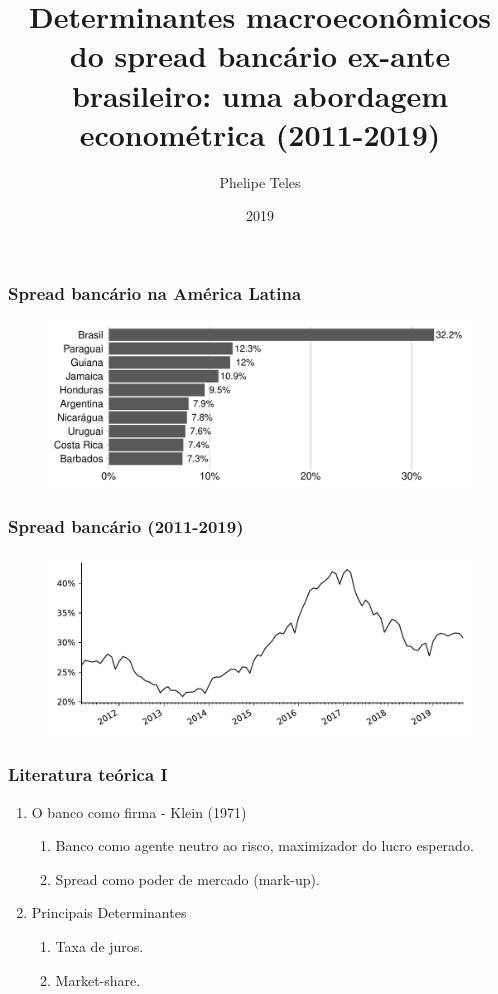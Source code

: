 \documentclass{beamer}
\title{Determinantes macroeconômicos do spread bancário ex-ante brasileiro: uma abordagem econométrica (2011-2019)}
\author{Phelipe Teles}
\date{2019}
\institute{Universidade Federal Rural do Rio de Janeiro}
\begin{document}
\frame{\titlepage}

\begin{frame}
    \frametitle{Spread bancário na América Latina}
    \centering
    \begin{figure}
        \includegraphics[scale=.6]{spread_AL.pdf}
    \end{figure}
\end{frame}

\begin{frame}
    \frametitle{Spread bancário (2011-2019)}
    \centering
    \begin{figure}[htbp]
        \includegraphics[width=\textwidth, scale=.6]{spread.pdf}
    \end{figure}
\end{frame}

\begin{frame}
    \frametitle{Literatura teórica I}
    \begin{enumerate}
        \item O banco como firma - Klein (1971)
            \begin{enumerate}
                \item Banco como agente neutro ao risco, maximizador do lucro esperado.
                \item Spread como poder de mercado (mark-up).
            \end{enumerate}
        \item Principais Determinantes
            \begin{enumerate}
                \item Taxa de juros.
                \item Market-share.
            \end{enumerate}
    \end{enumerate}

\end{frame}
\end{document}
